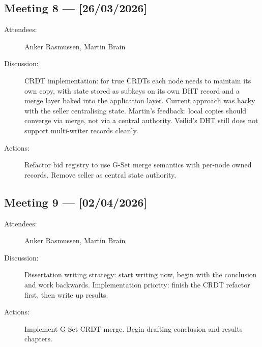 \subsection*{Meeting 8 — [26/03/2026]}
\begin{description}
  \item[Attendees:] Anker Rasmussen, Martin Brain
  \item[Discussion:] CRDT implementation: for true CRDTs each node needs to
    maintain its own copy, with state stored as subkeys on its own DHT
    record and a merge layer baked into the application layer.  Current
    approach was hacky with the seller centralising state.  Martin's
    feedback: local copies should converge via merge, not via a central
    authority.  Veilid's DHT still does not support multi-writer records
    cleanly.
  \item[Actions:] Refactor bid registry to use G-Set merge semantics with
    per-node owned records.  Remove seller as central state authority.
\end{description}
\subsection*{Meeting 9 — [02/04/2026]}
\begin{description}
  \item[Attendees:] Anker Rasmussen, Martin Brain
  \item[Discussion:] Dissertation writing strategy: start writing now,
    begin with the conclusion and work backwards.  Implementation priority:
    finish the CRDT refactor first, then write up results.
  \item[Actions:] Implement G-Set CRDT merge.  Begin drafting conclusion
    and results chapters.
\end{description}